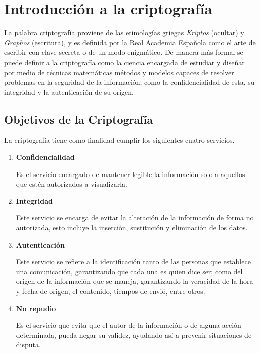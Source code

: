 %
%

\section{Introducción a la criptografía}

La palabra criptografía proviene de las etimologías griegas \textit{Kriptos} 
(ocultar) y \textit{Graphos} (escritura), y es definida por la Real Academia 
Española como el arte de escribir con clave secreta o de un modo enigmático. 
De manera más formal se puede definir a la criptografía como la ciencia 
encargada de estudiar y diseñar por medio de técnicas matemáticas métodos y 
modelos capaces de resolver problemas en la seguridad de la información, como 
la confidencialidad de esta, su integridad y la autenticación de su origen.

  \subsection{Objetivos de la Criptografía}
    
    La criptografía tiene como finalidad cumplir los siguientes cuatro 
    servicios.
    
    \begin{enumerate}
      
      \item \textbf{Confidencialidad}
        
        Es el servicio encargado de mantener legible la información solo a 
        aquellos que estén autorizados a visualizarla.
    
      \item \textbf{Integridad}
        
        Este servicio se encarga de evitar la alteración de la información de 
        forma no autorizada, esto incluye la inserción, sustitución y 
        eliminación de los datos.
    
      \item \textbf{Autenticación}
        
        Este servicio se refiere a la identificación tanto de las personas que 
        establece una comunicación, garantizando que cada una es quien dice 
        ser; como del origen de la información que se maneja, garantizando la 
        veracidad de la hora y fecha de origen, el contenido, tiempos de 
        envió, entre otros.

      \item \textbf{No repudio}
        
        Es el servicio que evita que el autor de la información o de alguna 
        acción determinada, pueda negar su validez, ayudando así a prevenir 
        situaciones de disputa.

    \end{enumerate}

